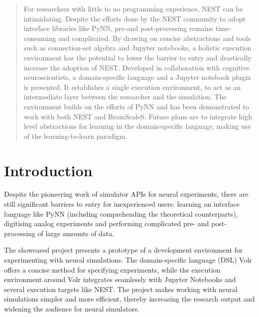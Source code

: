 \documentclass[a0,portrait]{a0poster}
\begin{document}
\begin{multicols}{2} %


\color{ku} %

\begin{abstract}

\noindent For researchers with little to no programming experience, NEST can be intimidating. Despite the efforts done by the NEST community to adopt interface libraries like PyNN, pre-and post-processing remains time-consuming and complicated. By drawing on concise abstractions and tools such as connection-set algebra and Jupyter notebooks, a holistic execution environment has the potential to lower the barrier to entry and drastically increase the adoption of NEST. Developed in collaboration with cognitive neuroscientists, a domain-specific language and a Jupyter notebook plugin is presented. It establishes a single execution environment, to act as an intermediate layer between the researcher and the simulation. The environment builds on the efforts of PyNN and has been demonstrated to work with both NEST and BrainScaleS. Future plans are to integrate high level abstractions for learning in the domain-specific language, making use of the learning-to-learn paradigm.
\end{abstract}

\color{SaddleBrown} %
\section*{Introduction}
Despite the pioneering work of simulator APIs for neural experiments, there are still 
significant barriers to entry for inexperienced users: learning an interface language like 
PyNN (including comprehending the theoretical counterparts), digitising analog experiments and 
performing complicated pre- and post-processing of large amounts of data.

The showcased project presents a prototype of a development environment for experimenting 
with neural simulations.
The domain-specific language (DSL) Volr offers a concise method for specifying experiments,
while the execution environment around Volr integrates seamlessly with Jupyter Notebooks and 
several execution targets like NEST. 
The project makes working with neural simulations simpler and more efficient, thereby
increasing the research output and widening the audience for neural simulators. 


\end{multicols}
\end{document}
